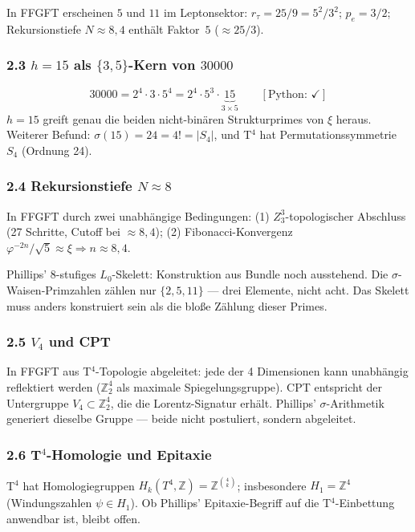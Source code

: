 In FFGFT erscheinen $5$ und $11$ im Leptonsektor:
$r_\tau = 25/9 = 5^2/3^2$; $p_e = 3/2$; Rekursionstiefe $N \approx 8{,}4$
enthält Faktor~$5$ ($\approx 25/3$).

\subsubsection*{2.3 $h = 15$ als $\{3,5\}$-Kern von $30000$}

\[
30000 = 2^4 \cdot 3 \cdot 5^4 = 2^4 \cdot 5^3 \cdot \underbrace{15}_{3 \times 5}
\qquad [\text{Python: } \checkmark]
\]
$h = 15$ greift genau die beiden nicht-binären Strukturprimes von $\xi$ heraus.
Weiterer Befund: $\sigma(15) = 24 = 4! = |S_4|$,
und T$^4$ hat Permutationssymmetrie $S_4$ (Ordnung 24).

\subsubsection*{2.4 Rekursionstiefe $N \approx 8$}

In FFGFT durch zwei unabhängige Bedingungen:
(1) $Z_3^3$-topologischer Abschluss (27 Schritte, Cutoff bei $\approx 8{,}4$);
(2) Fibonacci-Konvergenz $\varphi^{-2n}/\sqrt{5} \approx \xi \Rightarrow n \approx 8{,}4$.

Phillips' 8-stufiges $L_0$-Skelett: Konstruktion aus Bundle noch ausstehend.
Die $\sigma$-Waisen-Primzahlen zählen nur $\{2, 5, 11\}$ — drei Elemente,
nicht acht. Das Skelett muss anders konstruiert sein als die bloße Zählung
dieser Primes.

\subsubsection*{2.5 $V_4$ und CPT}

In FFGFT aus T$^4$-Topologie abgeleitet: jede der 4 Dimensionen kann
unabhängig reflektiert werden ($\mathbb{Z}_2^4$ als maximale Spiegelungsgruppe).
CPT entspricht der Untergruppe $V_4 \subset \mathbb{Z}_2^4$,
die die Lorentz-Signatur erhält. Phillips' $\sigma$-Arithmetik generiert
dieselbe Gruppe — beide nicht postuliert, sondern abgeleitet.

\subsubsection*{2.6 T$^4$-Homologie und Epitaxie}

T$^4$ hat Homologiegruppen $H_k(T^4, \mathbb{Z}) = \mathbb{Z}^{\binom{4}{k}}$;
insbesondere $H_1 = \mathbb{Z}^4$ (Windungszahlen $\psi \in H_1$).
Ob Phillips' Epitaxie-Begriff auf die T$^4$-Einbettung anwendbar ist,
bleibt offen.

